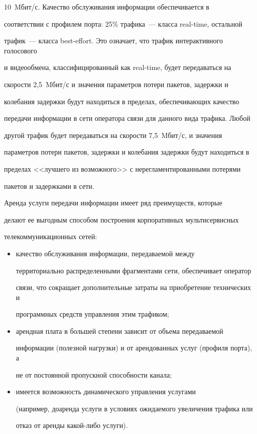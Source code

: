 10~Mбит/\!с. Качество обслуживания информации обеспечивается в 


соответствии с профилем порта: 25\% трафика~--- класса real-time, остальной 


трафик~--- класса best-effort. Это означает, что трафик интерактивного голосового 


и видеообмена, классифицированный как real-time, будет передаваться на 


скорости 2,5~Mбит/\!с и значения параметров потери пакетов, задержки и 


колебания задержки будут находиться в пределах, обеспечивающих качество 


передачи информации в сети оператора связи для данного вида трафика. Любой 


другой трафик будет передаваться на скорости 7,5~Mбит/\!с, и значения 


параметров потери пакетов, задержки и колебания задержки будут находиться в 


пределах <<лучшего из возможного>> с нерегламентированными потерями 


пакетов и задержками в сети.


      


      Аренда услуги передачи информации имеет ряд преимуществ, которые 


делают ее выгодным способом построения корпоративных мультисервисных 


телекоммуникационных сетей:


      \begin{itemize}


      \item качество обслуживания информации, передаваемой между 


территориально распределенными фрагментами сети, обеспечивает оператор 


связи, что сокращает дополнительные затраты на приобретение технических и 


программных средств управления этим трафиком;


      \item арендная плата в большей степени зависит от объема передаваемой 


информации (полезной нагрузки) и от арендованных услуг (профиля порта), а 


не от постоянной пропускной способности канала;


      \item имеется возможность динамического управления услугами 


(например, доаренда услуги в условиях ожидаемого увеличения трафика или 


отказ от аренды какой-либо услуги).


      \end{itemize}


